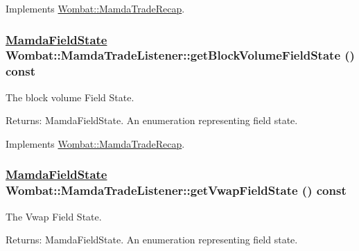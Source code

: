 Implements \hyperlink{classWombat_1_1MamdaTradeRecap_9b4768cd8bfe696c5a217d32926426f1}{Wombat::Mamda\-Trade\-Recap}.\hypertarget{classWombat_1_1MamdaTradeListener_4bff1adf74e14f18819160029796fa9d}{
\subsubsection[getBlockVolumeFieldState]{\setlength{\rightskip}{0pt plus 5cm}\hyperlink{namespaceWombat_93aac974f2ab713554fd12a1fa3b7d2a}{Mamda\-Field\-State} Wombat::Mamda\-Trade\-Listener::get\-Block\-Volume\-Field\-State () const}}
\label{classWombat_1_1MamdaTradeListener_4bff1adf74e14f18819160029796fa9d}


The block volume Field State. 

\begin{Desc}
\item[Returns:]Mamda\-Field\-State. An enumeration representing field state. \end{Desc}


Implements \hyperlink{classWombat_1_1MamdaTradeRecap_f39bf8db19885374b44a37a6b36311b1}{Wombat::Mamda\-Trade\-Recap}.\hypertarget{classWombat_1_1MamdaTradeListener_c21118c78e3c119f6009e90ff1dfa922}{
\subsubsection[getVwapFieldState]{\setlength{\rightskip}{0pt plus 5cm}\hyperlink{namespaceWombat_93aac974f2ab713554fd12a1fa3b7d2a}{Mamda\-Field\-State} Wombat::Mamda\-Trade\-Listener::get\-Vwap\-Field\-State () const}}
\label{classWombat_1_1MamdaTradeListener_c21118c78e3c119f6009e90ff1dfa922}


The Vwap Field State. 

\begin{Desc}
\item[Returns:]Mamda\-Field\-State. An enumeration representing field state. \end{Desc}


